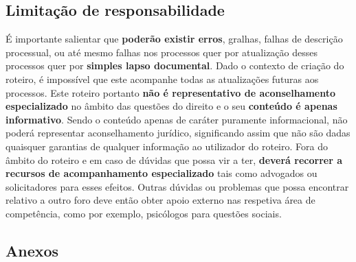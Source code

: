 \subsection{Limitação de responsabilidade}

É importante salientar que \textbf{poderão existir erros}, gralhas,
falhas de descrição processual, ou até mesmo falhas nos processos quer
por atualização desses processos quer por \textbf{simples lapso
	documental}. Dado o contexto de criação do roteiro, é impossível que
este acompanhe todas as atualizações futuras aos processos. Este roteiro
portanto \textbf{não é representativo de aconselhamento especializado}
no âmbito das questões do direito e o seu \textbf{conteúdo é apenas
	informativo}. Sendo o conteúdo apenas de caráter puramente
informacional, não poderá representar aconselhamento jurídico,
significando assim que não são dadas quaisquer garantias de qualquer
informação ao utilizador do roteiro. Fora do âmbito do roteiro e em caso
de dúvidas que possa vir a ter, \textbf{deverá recorrer a recursos de
	acompanhamento especializado} tais como advogados ou solicitadores para
esses efeitos. Outras dúvidas ou problemas que possa encontrar relativo
a outro foro deve então obter apoio externo nas respetiva área de
competência, como por exemplo, psicólogos para questões sociais.

\newpage

\subsection{Anexos}

